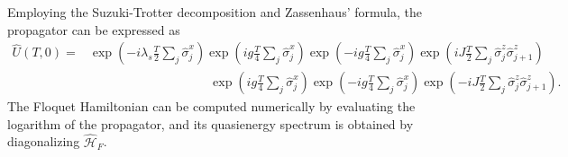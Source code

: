 \documentclass[a4paper,10pt]{article}
\begin{document}
Employing the Suzuki-Trotter decomposition and Zassenhaus’ formula, the propagator can be expressed as
\begin{align}
    \hat{U}(T,0) =& \exp\left(-i \lambda_s \frac{T}{2} \sum_{j}\hat{\sigma}_j^x\right)
    \exp\left(i g \frac{T}{4} \sum_{j}\hat{\sigma}_j^x\right)
    \exp\left(-i g \frac{T}{4} \sum_{j}\hat{\sigma}_j^x\right)\exp\left(i J \frac{T}{2} \sum_{j} \hat{\sigma}_j^z \hat{\sigma}_{j+1}^z\right)\nonumber\\
    &\hspace{4cm}\exp\left(i g \frac{T}{4} \sum_{j}\hat{\sigma}_j^x\right)\exp\left(-i g \frac{T}{4} \sum_{j}\hat{\sigma}_j^x\right)\exp\left(-i J \frac{T}{2} \sum_{j} \hat{\sigma}_j^z \hat{\sigma}_{j+1}^z\right).
\end{align}
The Floquet Hamiltonian can be computed numerically by evaluating the logarithm of the propagator, and its quasienergy spectrum is obtained by diagonalizing $\hat{\mathcal{H}}_F$.
\end{document}
